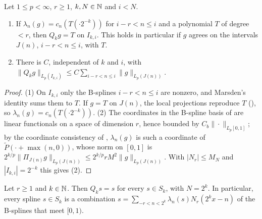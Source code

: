 \begin{lemma}
\label{lem:quasi-interp}
\leanok
{}
Let $1 \leq p < \infty$, $r \geq 1$, $k, N \in \mathbb{N}$ and $i < N$.
\begin{enumerate}
  \item If $\lambda_n(g) = c_n(T(\cdot 2^{-k}))$ for $i - r < n \leq i$ and a polynomial $T$ of
    degree $< r$, then $Q_k g = T$ on $I_{k,i}$. This holds in particular if $g$ agrees on the
    intervals $J(n)$, $i - r < n \leq i$, with $T$.
  \item There is $C$, independent of $k$ and $i$, with
    $\|Q_k g\|_{L_p(I_{k,i})} \leq C \sum_{i - r < n \leq i} \|g\|_{L_p(J(n))}$.
\end{enumerate}
\end{lemma}

\begin{proof}
\leanok
(1) On $I_{k,i}$ only the B-splines $i - r < n \leq i$ are nonzero, and Marsden's identity sums
them to $T$. If $g = T$ on $J(n)$, the local projections reproduce $T$ (), so
$\lambda_n(g) = c_n(T(\cdot 2^{-k}))$. (2) The coordinates in the B-spline basis of 
are linear functionals on a space of dimension $r$, hence bounded by $C_b \|\cdot\|_{L_p[0,1]}$;
by the coordinate consistency of , $\lambda_n(g)$ is such a coordinate of
$\tilde P(\cdot + \max(n, 0))$, whose norm on $[0, 1]$ is $2^{k/p} \|\Pi_{J(n)} g\|_{L_p(J(n))}
\leq 2^{k/p} r M^2 \|g\|_{L_p(J(n))}$. With $|N_r| \leq M_N$ and $|I_{k,i}| = 2^{-k}$ this gives (2).
\end{proof}

\begin{theorem}
\label{thm:qi-splines}
\leanok
{}
Let $r \geq 1$ and $k \in \mathbb{N}$. Then $Q_k s = s$ for every $s \in S_k$, with $N = 2^k$. In
particular, every spline $s \in S_k$ is a combination
$s = \sum_{-r < n < 2^k} \lambda_n(s) N_r(2^k x - n)$ of the B-splines that meet $[0, 1)$.
\end{theorem}

